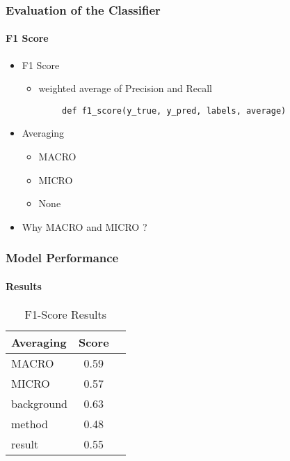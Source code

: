 \documentclass[
  xcolor={svgnames},
  hyperref={colorlinks,citecolor=DeepPink4,linkcolor=DarkRed,urlcolor=DarkBlue}
  ]{beamer}
\begin{document}
\begin{frame}[fragile]
\frametitle{Evaluation of the Classifier}
\framesubtitle{F1 Score}

\bigskip

\begin{itemize}
	\item F1 Score
		\begin{itemize}
			\item weighted average of Precision and Recall
		\end{itemize}
		\bigskip
		\begin{verbatim}
		def f1_score(y_true, y_pred, labels, average)
		\end{verbatim}
		\bigskip
	\item Averaging
		\begin{itemize}
			\item MACRO
			\item MICRO
			\item None
		\end{itemize}
	\bigskip
	\item Why {\color{red} MACRO} and {\color{red}MICRO} ?
	
\end{itemize}

\end{frame}

\begin{frame}
\frametitle{Model Performance}
\framesubtitle{Results}

\begin{table}
\def\arraystretch{1.5}
	{\setlength{\tabcolsep}{2em}
	\begin{tabular}{| l | c | c |} \hline
		 {\bf Averaging} & {\bf Score} \\
		 \hline \hline
		 MACRO & 0.59 \\
		  \hline
		 MICRO & 0.57 \\
		  \hline
		 background & 0.63 \\
		 method & 0.48 \\
		 result & 0.55 \\
		  \hline
	 \end{tabular}}

\caption{F1-Score Results}
\end{table}

\end{frame}
\end{document}
